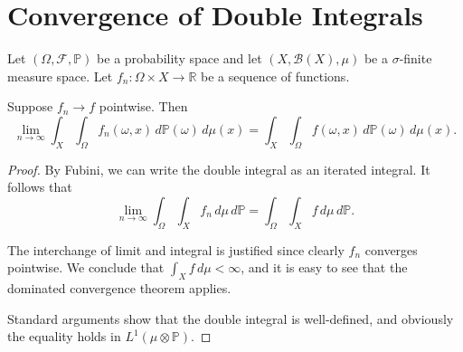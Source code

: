 
\section{Convergence of Double Integrals}

Let $(\Omega, \mathcal{F}, \mathbb{P})$ be a probability space and let
$(X, \mathcal{B}(X), \mu)$ be a $\sigma$-finite measure space.
Let $f_n : \Omega \times X \to \mathbb{R}$ be a sequence of functions.

\begin{theorem}
  \label{thm:fubini_limit}
  Suppose $f_n \to f$ pointwise. Then
  \[
    \lim_{n \to \infty} \int_X \int_\Omega f_n(\omega, x) \, d\mathbb{P}(\omega) \, d\mu(x)
    = \int_X \int_\Omega f(\omega, x) \, d\mathbb{P}(\omega) \, d\mu(x).
  \]
\end{theorem}

\begin{proof}
  By Fubini, we can write the double integral as an iterated integral.
  It follows that
  \[
    \lim_{n \to \infty} \int_\Omega \int_X f_n \, d\mu \, d\mathbb{P}
    = \int_\Omega \int_X f \, d\mu \, d\mathbb{P}.
  \]

  The interchange of limit and integral is justified since clearly $f_n$
  converges pointwise. We conclude that $\int_X f \, d\mu < \infty$,
  and it is easy to see that the dominated convergence theorem applies.

  Standard arguments show that the double integral is well-defined,
  and obviously the equality holds in $L^1(\mu \otimes \mathbb{P})$.
\end{proof}

